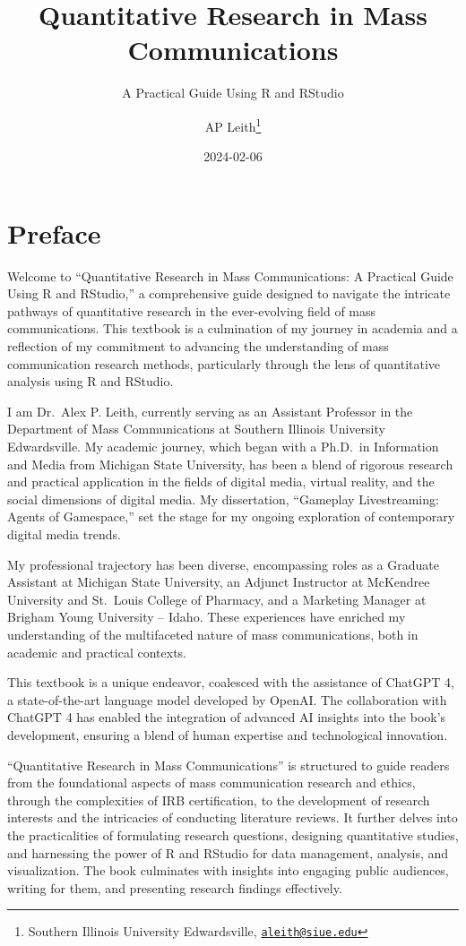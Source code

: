 \documentclass[
]{book}
\title{Quantitative Research in Mass Communications}
\subtitle{A Practical Guide Using R and RStudio}
\author{AP Leith\footnote{Southern Illinois University Edwardsville, \href{mailto:aleith@siue.edu}{\nolinkurl{aleith@siue.edu}}}}
\date{2024-02-06}
\begin{document}
\maketitle

{
\setcounter{tocdepth}{1}
\tableofcontents
}
\hypertarget{preface}{%
\chapter*{Preface}\label{preface}}

Welcome to ``Quantitative Research in Mass Communications: A Practical Guide Using R and RStudio,'' a comprehensive guide designed to navigate the intricate pathways of quantitative research in the ever-evolving field of mass communications. This textbook is a culmination of my journey in academia and a reflection of my commitment to advancing the understanding of mass communication research methods, particularly through the lens of quantitative analysis using R and RStudio.

I am Dr.~Alex P. Leith, currently serving as an Assistant Professor in the Department of Mass Communications at Southern Illinois University Edwardsville. My academic journey, which began with a Ph.D.~in Information and Media from Michigan State University, has been a blend of rigorous research and practical application in the fields of digital media, virtual reality, and the social dimensions of digital media. My dissertation, ``Gameplay Livestreaming: Agents of Gamespace,'' set the stage for my ongoing exploration of contemporary digital media trends.

My professional trajectory has been diverse, encompassing roles as a Graduate Assistant at Michigan State University, an Adjunct Instructor at McKendree University and St.~Louis College of Pharmacy, and a Marketing Manager at Brigham Young University -- Idaho. These experiences have enriched my understanding of the multifaceted nature of mass communications, both in academic and practical contexts.

This textbook is a unique endeavor, coalesced with the assistance of ChatGPT 4, a state-of-the-art language model developed by OpenAI. The collaboration with ChatGPT 4 has enabled the integration of advanced AI insights into the book's development, ensuring a blend of human expertise and technological innovation.

``Quantitative Research in Mass Communications'' is structured to guide readers from the foundational aspects of mass communication research and ethics, through the complexities of IRB certification, to the development of research interests and the intricacies of conducting literature reviews. It further delves into the practicalities of formulating research questions, designing quantitative studies, and harnessing the power of R and RStudio for data management, analysis, and visualization. The book culminates with insights into engaging public audiences, writing for them, and presenting research findings effectively.
\end{document}
